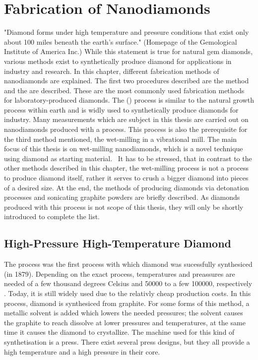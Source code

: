 
\chapter{Fabrication of Nanodiamonds}	\label{ch::fabrication_nanodiamonds}

	"Diamond forms under high temperature and pressure conditions that exist only about 100 miles beneath the earth’s surface." (Homepage of the Gemological Institute of America Inc.)
	While this statement is true for natural gem diamonds, various methods exist to synthetically produce diamond for applications in industry and research. 
	In this chapter, different fabrication methods of nanodiamonds are explained.
	The first two procedures described are the \hpht method and the \cvd are described.
	These are the most commonly used fabrication methods for laboratory-produced diamonds. 
	The \hpht (\HPHT) process is similar to the natural growth process within earth and is widly used to synthetically produce diamonds for industry.
	Many measurements which are subject in this thesis are carried out on nanodiamonds produced with a \CVD process. 
	This process is also the prerequisite for the third method mentioned, the wet-milling in a vibrational mill.
	The main focus of this thesis is on wet-milling nanodiamonds, which is a novel technique using \cvd diamond as starting material. 
	It has to be stressed, that in contrast to the other methods described in this chapter, the wet-milling process is not a process to produce diamond itself, rather it serves to crush a bigger diamond into pieces of  a desired size.
	At the end, the methods of producing diamonds via detonation processes and sonicating graphite powders are briefly described.
	As diamonds produced with this process is not scope of this thesis, they will only be shortly introduced to complete the list.

	

	\section{High-Pressure High-Temperature Diamond}

	The \HPHT process was the first process with which diamond was sucessfully synthesiced (in 1879).
	Depending on the exact process, temperatures and preassures are needed of a few thousand degrees Celsius and  \num{50000} to a few \num{100000}, respectively \cite{davis1993diamond}.
	Today, it is still widely used due to the relativly cheap production costs\cite{wikiSyntheticDiamond}.
	In this process, diamond is synthesiced from graphite.
	For some forms of this method, a metallic solvent is added which lowers the needed pressures; the solvent causes the graphite to reach dissolve at lower pressures and temperatures, at the same time it causes the diamond to crystallize.
	The machine used for this kind of synthetisation is a press.
	There exist several press designs, but they all provide a high temperature and a high pressure in their core.


